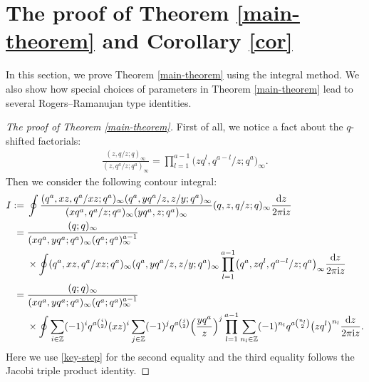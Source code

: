 \documentclass[10pt,a4paper]{amsart}
\numberwithin{equation}{section}
\theoremstyle{definition}
\begin{document}
\section{The proof of Theorem \ref{main-theorem} and Corollary \ref{cor}}\label{proof}
In this section, we prove Theorem \ref{main-theorem} using the integral method. We also show how special choices of parameters in Theorem \ref{main-theorem} lead to several Rogers--Ramanujan type identities.
\begin{proof}[The proof of Theorem \ref{main-theorem}]
First of all, we notice a fact about the $q$-shifted factorials:
\begin{align}\label{key-step}
\frac{(z,q/z;q)_{\infty}}{(z,q^a/z;q^a)_{\infty}}=\prod_{l=1}^{a-1}\bigl(zq^l,q^{a-l}/z;q^a\bigr)_{\infty}.
\end{align}
Then we consider the following contour integral:
\begin{align*}
I:={}&\oint \frac{(q^a,xz,q^a/xz;q^a)_{\infty}(q^a,yq^a/z,z/y;q^a)_{\infty}} {(xq^a,q^a/z;q^a)_{\infty}(yq^a,z;q^a)_{\infty}}(q,z,q/z;q)_{\infty}\frac{{\rm d}z}{2\pi {\rm i}z}\\
={}&\frac{(q;q)_{\infty}}{(xq^a,yq^a;q^a)_{\infty}(q^a;q^a)^{a-1}_{\infty}} \\ & \times\oint(q^a,xz,q^a/xz;q^a)_{\infty}(q^a,yq^a/z,z/y;q^a)_{\infty}
\prod_{l=1}^{a-1}\bigl(q^a,zq^l,q^{a-l}/z;q^a\bigr)_{\infty}\frac{{\rm d}z}{2\pi {\rm i}z}\\
={}& \frac{(q;q)_{\infty}}{(xq^a,yq^a;q^a)_{\infty}(q^a;q^a)^{a-1}_{\infty}}\\
& \times\oint\sum_{i\in\mathbb{Z}}(-1)^iq^{a\binom{i}{2}}(xz)^i\sum_{j\in\mathbb{Z}} (-1)^jq^{a\binom{j}{2}}\Bigl(\frac{yq^a}{z}\Bigr)^j
\prod_{l=1}^{a-1}\sum_{n_l\in\mathbb{Z}}(-1)^{n_l}q^{a\binom{n_l}{2}}\bigl(zq^l\bigr)^{n_l}\frac{{\rm d}z}{2\pi {\rm i}z}.
\end{align*}
Here we use \eqref{key-step} for the second equality and the third equality follows the Jacobi triple product identity.


\end{proof}
\end{document}
